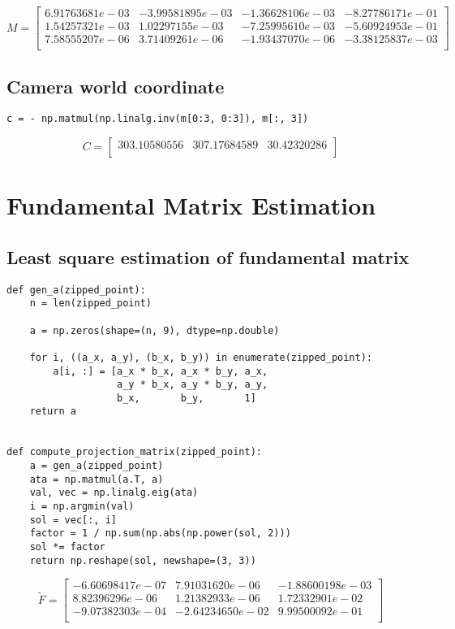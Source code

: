 \documentclass[a4paper,11pt]{article}
\begin{document}
\[
M=
\begin{bmatrix}
  6.91763681e-03 & -3.99581895e-03 & -1.36628106e-03 & -8.27786171e-01\\
  1.54257321e-03 & 1.02297155e-03 & -7.25995610e-03 & -5.60924953e-01\\
  7.58555207e-06 & 3.71409261e-06 & -1.93437070e-06 & -3.38125837e-03\\
\end{bmatrix}
\]

\subsection{Camera world coordinate}

\begin{lstlisting}
c = - np.matmul(np.linalg.inv(m[0:3, 0:3]), m[:, 3])
\end{lstlisting}

\[
C=
\begin{bmatrix}
  303.10580556 & 307.17684589 & 30.42320286\\
\end{bmatrix}
\]

\section{Fundamental Matrix Estimation}

\subsection{Least square estimation of fundamental matrix}
\begin{lstlisting}
def gen_a(zipped_point):
    n = len(zipped_point)

    a = np.zeros(shape=(n, 9), dtype=np.double)

    for i, ((a_x, a_y), (b_x, b_y)) in enumerate(zipped_point):
        a[i, :] = [a_x * b_x, a_x * b_y, a_x,
                   a_y * b_x, a_y * b_y, a_y,
                   b_x,       b_y,       1]
    return a


def compute_projection_matrix(zipped_point):
    a = gen_a(zipped_point)
    ata = np.matmul(a.T, a)
    val, vec = np.linalg.eig(ata)
    i = np.argmin(val)
    sol = vec[:, i]
    factor = 1 / np.sum(np.abs(np.power(sol, 2)))
    sol *= factor
    return np.reshape(sol, newshape=(3, 3))
\end{lstlisting}

\[
\tilde{F} = 
\begin{bmatrix}
  -6.60698417e-07 & 7.91031620e-06 & -1.88600198e-03\\
  8.82396296e-06 & 1.21382933e-06 & 1.72332901e-02\\
  -9.07382303e-04 & -2.64234650e-02 & 9.99500092e-01\\
\end{bmatrix}
\]
\end{document}
